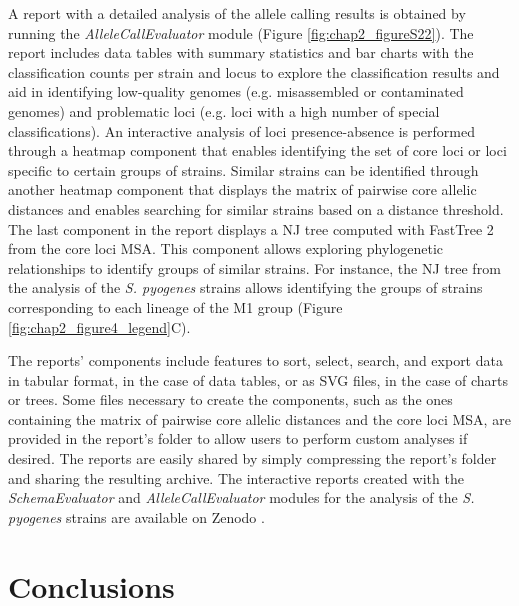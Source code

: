 A report with a detailed analysis of the allele calling results is obtained by running the \textit{AlleleCallEvaluator} module (Figure \ref{fig:chap2_figureS22}). The report includes data tables with summary statistics and bar charts with the classification counts per strain and locus to explore the classification results and aid in identifying low-quality genomes (e.g. misassembled or contaminated genomes) and problematic loci (e.g. loci with a high number of special classifications). An interactive analysis of loci presence-absence is performed through a heatmap component that enables identifying the set of core loci or loci specific to certain groups of strains. Similar strains can be identified through another heatmap component that displays the matrix of pairwise core allelic distances and enables searching for similar strains based on a distance threshold. The last component in the report displays a \ac{NJ} tree computed with FastTree 2 \citep{price_fasttree_2010} from the core loci \ac{MSA}. This component allows exploring phylogenetic relationships to identify groups of similar strains. For instance, the \ac{NJ} tree from the analysis of the \textit{S. pyogenes} strains allows identifying the groups of strains corresponding to each lineage of the M1 group (Figure \ref{fig:chap2_figure4_legend}C).

The reports' components include features to sort, select, search, and export data in tabular format, in the case of data tables, or as \ac{SVG} files, in the case of charts or trees. Some files necessary to create the components, such as the ones containing the matrix of pairwise core allelic distances and the core loci \ac{MSA}, are provided in the report's folder to allow users to perform custom analyses if desired. The reports are easily shared by simply compressing the report's folder and sharing the resulting archive. The interactive reports created with the \textit{SchemaEvaluator} and \textit{AlleleCallEvaluator} modules for the analysis of the \textit{S. pyogenes} strains are available on Zenodo \citep{mamede_supplementary_2025}.

\section{Conclusions} \label{sec:ch2_conclusions}

